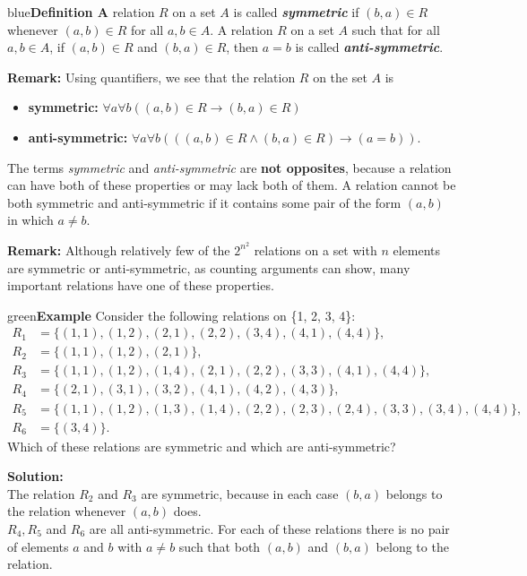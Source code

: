 \documentclass[11pt]{article}
\newenvironment{example}[1][\unskip]{\begin{mybox}{green}{\textbf{Example} {#1}}}{\end{mybox}}
\newenvironment{definition}[1]{\begin{mybox}{blue}{\textbf{Definition #1}}}{\end{mybox}}
\begin{document}
\begin{definition}{4}
A relation $R$ on a set $A$ is called \textbf{\textit{symmetric}} if $(b,a) \in R$ whenever $(a,b) \in R$ for all $a, b \in A$. A relation $R$ on a set $A$ such that for all $a, b \in A$, if $(a, b) \in R$ and $(b, a) \in R$, then $a = b$ is called \textbf{\textit{anti-symmetric}}.
\end{definition}
\textbf{Remark:} Using quantifiers, we see that the relation $R$ on the set $A$ is
\begin{itemize}
    \item \textbf{symmetric:} $\forall a \forall b ((a, b) \in R \rightarrow (b, a) \in R)$
    \item \textbf{anti-symmetric:} $\forall a \forall b (((a, b) \in R \land (b, a) \in R) \rightarrow (a = b))$.
\end{itemize}

The terms \textit{symmetric} and \textit{anti-symmetric} are \textbf{not opposites}, because a relation can have both of these properties or may lack both of them. A relation cannot be both symmetric and anti-symmetric if it contains some pair of the form $(a, b)$ in which $a \neq b$.

\textbf{Remark:} Although relatively few of the $2^{n^2}$ relations on a set with $n$ elements are symmetric or anti-symmetric, as counting arguments can show, many important relations have one of these properties.

\begin{example}
Consider the following relations on \{1, 2, 3, 4\}:
\begin{align*}
    R_1 &= \{(1, 1), (1, 2), (2, 1), (2, 2), (3, 4), (4, 1), (4, 4)\},\\
    R_2 &= \{(1, 1), (1, 2), (2, 1)\},\\
    R_3 &= \{(1, 1), (1, 2), (1, 4), (2, 1), (2, 2), (3, 3), (4, 1), (4, 4)\},\\
    R_4 &= \{(2, 1), (3, 1), (3, 2), (4, 1), (4, 2), (4, 3)\},\\
    R_5 &= \{(1, 1), (1, 2), (1, 3), (1, 4), (2, 2), (2, 3), (2, 4), (3, 3), (3, 4), (4, 4)\},\\
    R_6 &= \{(3, 4)\}.
\end{align*}
Which of these relations are symmetric and which are anti-symmetric?

\textbf{Solution:}\\
The relation $R_2$ and $R_3$ are symmetric, because in each case $(b, a)$ belongs to the relation whenever $(a, b)$ does.\\
$R_4, R_5$ and $R_6$ are all anti-symmetric. For each of these relations there is no pair of elements $a$ and $b$ with $a \neq b$ such that both $(a, b)$ and $(b, a)$ belong to the relation.
\end{example}
\end{document}

